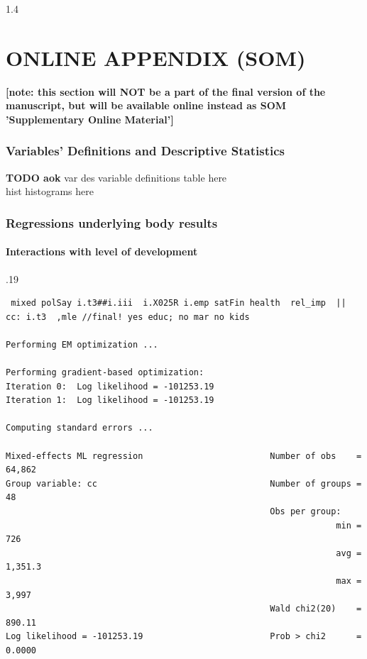 \documentclass[10pt, letterpaper]{article}
\begin{document}
\begin{spacing}{1.4}
\setcounter{section}{0}
 \part*{\Huge ONLINE APPENDIX (SOM)}
 \textbf{[note: this section will NOT be a part of the final version of
   the manuscript, but will be available online instead as SOM 'Supplementary Online
   Material']} %

\tableofcontents
{} 

\section{Variables' Definitions and  Descriptive Statistics}

\textbf{TODO aok}
var des variable definitions table here\\

hist histograms here\\

\section{Regressions underlying body results}

\subsection{Interactions with level of development}

\begin{scriptsize}
\begin{spacing}{.19} 
\begin{verbatim}
 mixed polSay i.t3##i.iii  i.X025R i.emp satFin health  rel_imp  || cc: i.t3  ,mle //final! yes educ; no mar no kids

Performing EM optimization ...

Performing gradient-based optimization: 
Iteration 0:  Log likelihood = -101253.19  
Iteration 1:  Log likelihood = -101253.19  

Computing standard errors ...

Mixed-effects ML regression                         Number of obs    =  64,862
Group variable: cc                                  Number of groups =      48
                                                    Obs per group:
                                                                 min =     726
                                                                 avg = 1,351.3
                                                                 max =   3,997
                                                    Wald chi2(20)    =  890.11
Log likelihood = -101253.19                         Prob > chi2      =  0.0000


\end{verbatim}
\end{spacing}
\end{scriptsize}
\end{spacing}
\end{document}
